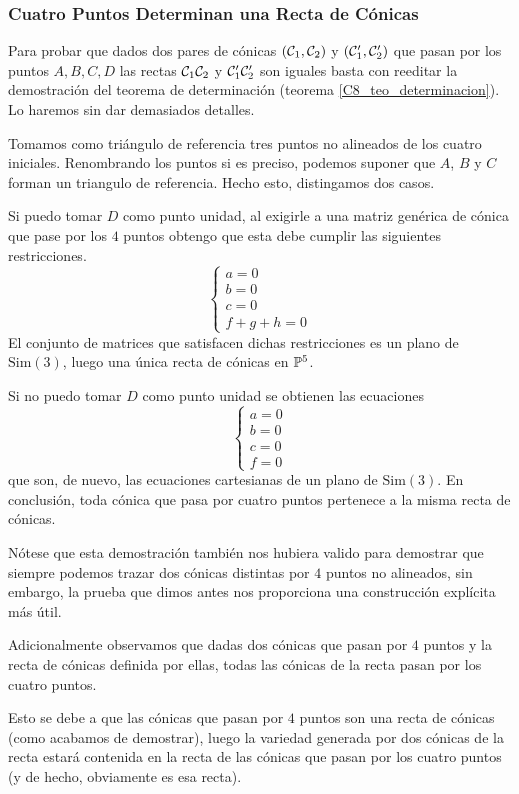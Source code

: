 \subsubsection{Cuatro Puntos Determinan una Recta de Cónicas}
Para probar que dados dos pares de cónicas $(\mathcal{C}_1,\mathcal{C}_2)$ y $(\mathcal{C}_1',\mathcal{C}_2')$ que pasan por los puntos $A,B,C,D$ las rectas $\mathcal{C}_1\mathcal{C}_2$ y $\mathcal{C}_1'\mathcal{C}_2'$ son iguales basta con reeditar la demostración del teorema de determinación (teorema \ref{C8_teo_determinacion}). Lo haremos sin dar demasiados detalles.

Tomamos como triángulo de referencia tres puntos no alineados de los cuatro iniciales. Renombrando los puntos si es preciso, podemos suponer que $A$, $B$ y $C$ forman un triangulo de referencia. Hecho esto, distingamos dos casos.

Si puedo tomar $D$ como punto unidad, al exigirle a una matriz genérica de cónica que pase por los $4$ puntos obtengo que esta debe cumplir las siguientes restricciones.
\begin{equation*}
	\left\{\begin{array}{c}
	a=0\\
	b=0\\
	c=0\\
	f+g+h=0
	\end{array}\right.
\end{equation*}
El conjunto de matrices que satisfacen dichas restricciones es un plano de $\mathrm{Sim}(3)$, luego una única recta de cónicas en $\mathbb{P}^5$.

Si no puedo tomar $D$ como punto unidad se obtienen las ecuaciones
\begin{equation*}
	\left\{\begin{array}{c}
		a=0\\
		b=0\\
		c=0\\
		f=0
	\end{array}\right.
\end{equation*}
que son, de nuevo, las ecuaciones cartesianas de un plano de $\mathrm{Sim}(3)$.
En conclusión, toda cónica que pasa por cuatro puntos pertenece a la misma recta de cónicas.

Nótese que esta demostración también nos hubiera valido para demostrar que siempre podemos trazar dos cónicas distintas por $4$ puntos no alineados, sin embargo, la prueba que dimos antes nos proporciona una construcción explícita más útil.
\begin{obs}
	Adicionalmente observamos que dadas dos cónicas que pasan por $4$ puntos y la recta de cónicas definida por ellas, todas las cónicas de la recta pasan por los cuatro puntos.
	
	Esto se debe a que las cónicas que pasan por $4$ puntos son una recta de cónicas (como acabamos de demostrar), luego la variedad generada por dos cónicas de la recta estará contenida en la recta de las cónicas que pasan por los cuatro puntos (y de hecho, obviamente es esa recta).
\end{obs}

